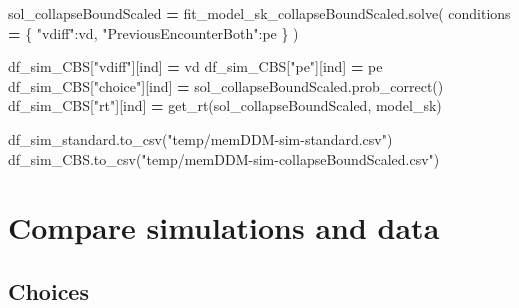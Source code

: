 \documentclass[
]{book}
\newenvironment{Shaded}{\begin{snugshade}}{\end{snugshade}}
\newcommand{\NormalTok}[1]{#1}
\newcommand{\OperatorTok}[1]{\textcolor[rgb]{0.81,0.36,0.00}{\textbf{#1}}}
\newcommand{\StringTok}[1]{\textcolor[rgb]{0.31,0.60,0.02}{#1}}
\begin{document}
\begin{Shaded}
\begin{Highlighting}[]
\NormalTok{      sol\_collapseBoundScaled }\OperatorTok{=}\NormalTok{ fit\_model\_sk\_collapseBoundScaled.solve(}
\NormalTok{        conditions }\OperatorTok{=}\NormalTok{ \{}
          \StringTok{"vdiff"}\NormalTok{:vd,}
          \StringTok{"PreviousEncounterBoth"}\NormalTok{:pe}
\NormalTok{        \}}
\NormalTok{      )}
      
\NormalTok{      df\_sim\_CBS[}\StringTok{"vdiff"}\NormalTok{][ind] }\OperatorTok{=}\NormalTok{ vd}
\NormalTok{      df\_sim\_CBS[}\StringTok{"pe"}\NormalTok{][ind] }\OperatorTok{=}\NormalTok{ pe}
\NormalTok{      df\_sim\_CBS[}\StringTok{"choice"}\NormalTok{][ind] }\OperatorTok{=}\NormalTok{ sol\_collapseBoundScaled.prob\_correct()}
\NormalTok{      df\_sim\_CBS[}\StringTok{"rt"}\NormalTok{][ind] }\OperatorTok{=}\NormalTok{ get\_rt(sol\_collapseBoundScaled, model\_sk)}
      
\NormalTok{df\_sim\_standard.to\_csv(}\StringTok{"temp/memDDM{-}sim{-}standard.csv"}\NormalTok{)}
\NormalTok{df\_sim\_CBS.to\_csv(}\StringTok{"temp/memDDM{-}sim{-}collapseBoundScaled.csv"}\NormalTok{)}
\end{Highlighting}
\end{Shaded}

\hypertarget{compare-simulations-and-data}{%
\section{Compare simulations and data}\label{compare-simulations-and-data}}

\hypertarget{choices}{%
\subsection{Choices}\label{choices}}
\end{document}
